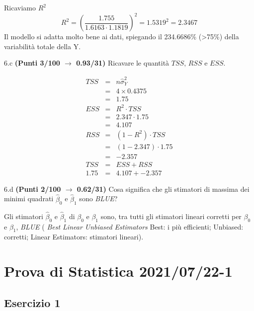 \documentclass[
  11pt,
]{book}
\theoremstyle{mytheoremstyle}
\theoremstyle{mydefstyle}
\newenvironment{sol}
  {
  \begin{tcolorbox}[enhanced,breakable,arc=0.1mm,boxrule=1pt,colback=white,colframe=iblue,
  title=\bf \fontfamily{lmss}\selectfont \hspace{.5 cm} Soluzione,drop fuzzy shadow]

}{
\end{tcolorbox}
  }
\begin{document}
\begin{sol}
Ricaviamo \(R^2\)
\[
R^2=\left(\frac{1.755}{1.6163\cdot 1.1819}\right)^2=1.5319^2=2.3467
\]
Il modello si adatta molto bene ai dati, spiegando il 234.6686\% (\textgreater75\%) della variabilità totale della Y.

\end{sol}

6.c \textbf{(Punti 3/100 \(\rightarrow\) 0.93/31)} Ricavare le quantità \(TSS\), \(RSS\) e \(ESS\).

\begin{sol}
\begin{eqnarray*}
   TSS &=& n\hat\sigma^2_Y\\
      &=& 4 \times 0.4375 \\
      &=&  1.75 \\
   ESS &=& R^2\cdot TSS\\
      &=&  2.347 \cdot 1.75 \\
      &=& 4.107 \\
   RSS &=& (1-R^2)\cdot TSS\\
      &=& (1- 2.347 )\cdot 1.75 \\
      &=&  -2.357 \\
   TSS &=& ESS+RSS \\ 1.75  &=&  4.107 + -2.357 
  \end{eqnarray*}

\end{sol}

6.d \textbf{(Punti 2/100 \(\rightarrow\) 0.62/31)} Cosa significa che gli stimatori di massima dei minimi quadrati \(\hat\beta_0\) e \(\hat\beta_1\) sono \emph{BLUE}?

\begin{sol}
Gli stimatori \(\hat\beta_{0}\) e \(\hat\beta_{1}\) di \(\beta_{0}\) e \(\beta_{1}\)
sono, tra tutti gli stimatori lineari corretti per \(\beta_0\) e \(\beta_1\), \emph{BLUE}
( \emph{Best Linear Unbiased Estimators} Best: i più efficienti; Unbiased: corretti;
Linear Estimators: stimatori lineari).

\end{sol}

\section{Prova di Statistica 2021/07/22-1}\label{prova-di-statistica-20210722-1}

\subsection{Esercizio 1}\label{esercizio-1-8}
\end{document}
